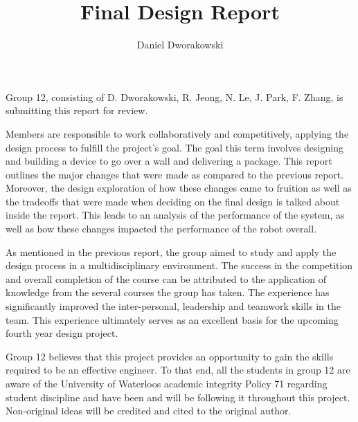 \documentclass[ece]{uw-wkrpt}
\begin{document}

\title{Final Design Report}
\author{Daniel Dworakowski}
\address{University of Waterloo,\\*
        Waterloo, ON\ \ N2L 3G1}
\employeraddress{}
\maketitle

\frontmatter

\begin{letter}
Group 12, consisting of D. Dworakowski, R. Jeong, N. Le, J. Park, F. Zhang, is submitting this report for review.

Members are responsible to work collaboratively and competitively, applying the design process to fulfill the project’s goal. The goal this term involves designing and building a device to go over a wall and delivering a package. This report outlines the major changes that were made as compared to the previous report. Moreover, the design exploration of how these changes came to fruition as well as the tradeoffs that were made when deciding on the final design is talked about inside the report. This leads to an analysis of the performance of the system, as well as how these changes impacted the performance of the robot overall.

As mentioned in the previous report, the group aimed to study and apply the design process in a multidisciplinary environment. The success in the competition and overall completion of the course can be attributed to the application of knowledge from the several courses the group has taken. The experience has significantly improved the inter-personal, leadership and teamwork skills in the team. This experience ultimately serves as an excellent basis for the upcoming fourth year design project. 

Group 12 believes that this project provides an opportunity to gain the skills required to be an effective engineer. To that end, all the students in group 12 are aware of the University of Waterloo\textsc{}s academic integrity Policy 71 regarding \textsc{}student discipline\textsc{} and have been and will be following it throughout this project. Non-original ideas will be credited and cited to the original author.

\end{letter}
\end{document}
